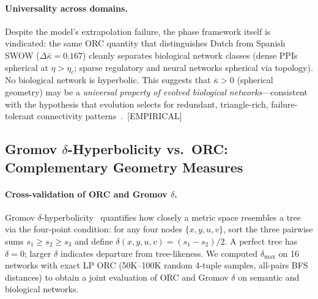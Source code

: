 \documentclass[11pt,a4paper]{article}
\newcommand{\kbar}{\bar{\kappa}}
\newcommand{\etac}{\eta_c}
\begin{document}
\paragraph{Universality across domains.}
Despite the model's extrapolation failure, the phase framework itself is vindicated: the same ORC quantity that distinguishes Dutch from Spanish SWOW ($\Delta\kbar = 0.167$) cleanly separates biological network classes (dense PPIs spherical at $\eta > \etac$; sparse regulatory and neural networks spherical via topology). No biological network is hyperbolic. This suggests that $\kbar > 0$ (spherical geometry) may be a \emph{universal property of evolved biological networks}---consistent with the hypothesis that evolution selects for redundant, triangle-rich, failure-tolerant connectivity patterns~\cite{barabasi2004network}.~[EMPIRICAL]

\subsection{Gromov $\delta$-Hyperbolicity vs.\ ORC: Complementary Geometry Measures}
\label{sec:gromov}

\paragraph{Cross-validation of ORC and Gromov $\delta$.}
Gromov $\delta$-hyperbolicity~\cite{gromov1987hyperbolic} quantifies how closely a metric space resembles a tree via the four-point condition: for any four nodes $\{x,y,u,v\}$, sort the three pairwise sums $s_1 \geq s_2 \geq s_3$ and define $\delta(x,y,u,v) = (s_1 - s_2)/2$. A perfect tree has $\delta = 0$; larger $\delta$ indicates departure from tree-likeness. We computed $\delta_{\max}$ on 16 networks with exact LP ORC (50K--100K random 4-tuple samples, all-pairs BFS distances) to obtain a joint evaluation of ORC and Gromov $\delta$ on semantic and biological networks.
\end{document}
